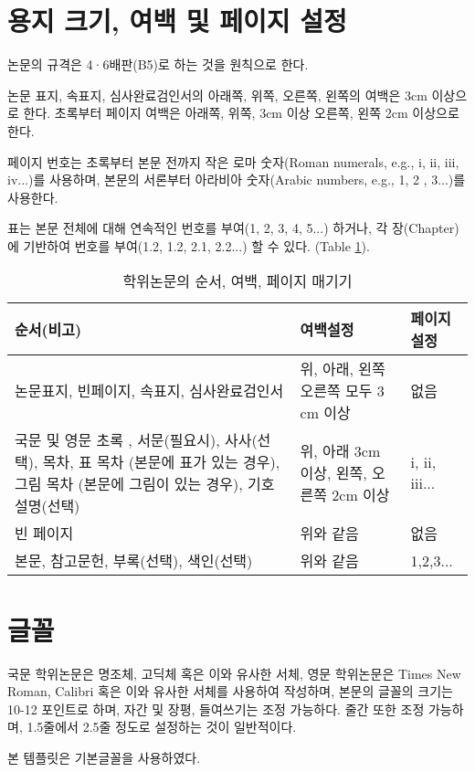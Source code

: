 \documentclass[11pt]{report}
\begin{document}
\section{용지 크기, 여백 및 페이지 설정} \label{sec:papersize}
논문의 규격은 4·6배판(B5)로 하는 것을 원칙으로 한다.

논문 표지, 속표지, 심사완료검인서의 아래쪽, 위쪽, 오른쪽, 왼쪽의 여백은 3cm 이상으로 한다. 초록부터 페이지 여백은 아래쪽, 위쪽, 3cm 이상 오른쪽, 왼쪽 2cm 이상으로 한다.

페이지 번호는 초록부터 본문 전까지 작은 로마 숫자(Roman numerals, e.g., i, ii, iii, iv...)를 사용하며, 본문의 서론부터 아라비아 숫자(Arabic numbers, e.g., 1, 2 , 3...)를 사용한다.

표는 본문 전체에 대해 연속적인 번호를 부여(1, 2, 3, 4, 5...) 하거나, 각 장(Chapter)에 기반하여 번호를 부여(1.2, 1.2, 2.1, 2.2...) 할 수 있다. (Table \ref{tab:Organizing and formatting}).

\renewcommand\tablename{표}
\begin{table}
\caption{학위논문의 순서, 여백, 페이지 매기기}
\label{tab:Organizing and formatting}
\vspace{0.5cm}
\begin{tabular}{ m{7cm} m{3cm} m{2cm}}
\toprule
순서(비고) & 여백설정& 페이지설정\\\midrule
논문표지, 빈페이지, 속표지, 심사완료검인서  &	 위, 아래, 왼쪽 오른쪽 모두 3 cm 이상	&	없음\\\midrule
국문 및 영문 초록 , 서문(필요시), 사사(선택), 목차, 표 목차 (본문에 표가 있는 경우), 그림 목차 (본문에 그림이 있는 경우), 기호설명(선택)	& 위, 아래 3cm 이상, 왼쪽, 오른쪽 2cm 이상  &  i, ii, iii...         \\\midrule		
빈 페이지 & 위와 같음 & 없음\\\midrule
본문, 참고문헌, 부록(선택), 색인(선택) & 위와 같음 & 1,2,3...	\\\bottomrule

\end{tabular}
\end{table}

\section{글꼴} \label{sec:font}
국문 학위논문은 명조체, 고딕체 혹은 이와 유사한 서체, 영문 학위논문은 Times New Roman, Calibri 혹은 이와 유사한 서체를 사용하여 작성하며, 본문의 글꼴의 크기는 10-12 포인트로 하며, 자간 및 장평, 들여쓰기는 조정 가능하다. 줄간 또한 조정 가능하며, 1.5줄에서 2.5줄 정도로 설정하는 것이 일반적이다. \par 
본 템플릿은 기본글꼴을 사용하였다.\par 
\end{document}
